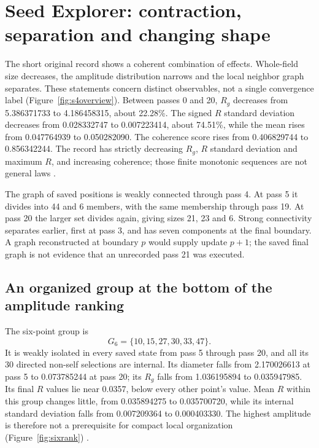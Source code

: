 \documentclass[11pt,a4paper]{article}
\begin{document}
\section{Seed Explorer: contraction, separation and changing shape}
\label{sec:s4behavior}
The short original record shows a coherent combination of effects. Whole-field size decreases, the amplitude distribution narrows and the local neighbor graph separates. These statements concern distinct observables, not a single convergence label (Figure~\ref{fig:s4overview}). Between passes 0 and 20, $R_g$ decreases from 5.386371733 to 4.186458315, about 22.28\%. The signed $R$ standard deviation decreases from 0.028332747 to 0.007223414, about 74.51\%, while the mean rises from 0.047764939 to 0.050282090. The coherence score rises from 0.406829744 to 0.856342244. The record has strictly decreasing $R_g$, $R$ standard deviation and maximum $R$, and increasing coherence; those finite monotonic sequences are not general laws \cite{review4}.

The graph of saved positions is weakly connected through pass 4. At pass 5 it divides into 44 and 6 members, with the same membership through pass 19. At pass 20 the larger set divides again, giving sizes 21, 23 and 6. Strong connectivity separates earlier, first at pass 3, and has seven components at the final boundary. A graph reconstructed at boundary $p$ would supply update $p+1$; the saved final graph is not evidence that an unrecorded pass 21 was executed.

\subsection{An organized group at the bottom of the amplitude ranking}
The six-point group is
\begin{equation}
G_6=\{10,15,27,30,33,47\}.\label{eq:sixIDs}
\end{equation}
It is weakly isolated in every saved state from pass 5 through pass 20, and all its 30 directed non-self selections are internal. Its diameter falls from 2.170026613 at pass 5 to 0.073785244 at pass 20; its $R_g$ falls from 1.036195894 to 0.035947985. Its final $R$ values lie near 0.0357, below every other point's value. Mean $R$ within this group changes little, from 0.035894275 to 0.035700720, while its internal standard deviation falls from 0.007209364 to 0.000403330. The highest amplitude is therefore not a prerequisite for compact local organization (Figure~\ref{fig:sixrank}) \cite{review4}.
\end{document}

